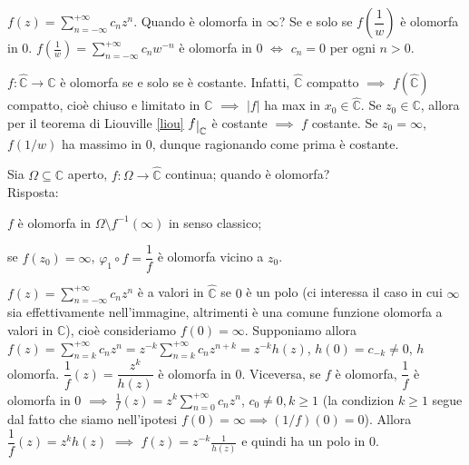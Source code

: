 \begin{ex}
  $\displaystyle f(z)=\sum_{n=-\infty}^{+\infty} c_nz^n$. Quando è olomorfa in $\infty$? Se e solo se $f\left(\dfrac{1}{w}\right)$ è olomorfa in $0$.
  $\displaystyle f\left(\frac{1}{w}\right)=\sum_{n=-\infty}^{+\infty} c_nw^{-n}$ è olomorfa in $0$ $\iff$ $c_n=0$ per ogni $n>0$.
\end{ex}

\begin{oss}
  $f: \hat{\mathbb{C}} \longrightarrow \mathbb{C}$ è olomorfa se e solo se è costante. Infatti, $\hat{\mathbb{C}}$ compatto $\implies$ $f(\hat{\mathbb{C}})$ compatto, cioè chiuso e limitato in $\mathbb{C}$ $\implies$ $|f|$ ha max in $x_0 \in \hat{\mathbb{C}}$.
  Se $z_0 \in \mathbb{C}$, allora per il teorema di Liouville \ref{liou} $f \restrict{\mathbb{C}}$ è costante $\implies$ $f$ costante. Se $z_0=\infty$, $f(1/w)$ ha massimo in $0$, dunque ragionando come prima è costante.
\end{oss}

Sia $\Omega \subseteq \mathbb{C}$ aperto, $f:\Omega \longrightarrow \hat{\mathbb{C}}$ continua; quando è olomorfa? \\
Risposta:
\begin{nlist}
  \item $f$ è olomorfa in $\Omega \setminus f^{-1}(\infty)$ in senso classico;
  \item se $f(z_0)=\infty$, $\varphi_1 \circ f=\dfrac{1}{f}$ è olomorfa vicino a $z_0$.
\end{nlist}

\begin{ex}
  $\displaystyle f(z)=\sum_{n=-\infty}^{+\infty} c_nz^n$ è a valori in $\hat{\mathbb{C}}$ se $0$ è un polo (ci interessa il caso in cui $\infty$ sia effettivamente nell'immagine, altrimenti è una comune funzione olomorfa a valori in $\mathbb{C}$), cioè consideriamo $f(0)=\infty$.
  Supponiamo allora $\displaystyle f(z)=\sum_{n=k}^{+\infty} c_nz^n=z^{-k}\sum_{n=k}^{+\infty} c_nz^{n+k}=z^{-k}h(z)$, $h(0)=c_{-k}\not=0$, $h$ olomorfa. $\dfrac{1}{f}(z)=\dfrac{z^k}{h(z)}$ è olomorfa in $0$.
  Viceversa, se $f$ è olomorfa, $\dfrac{1}{f}$ è olomorfa in $0$ $\implies$ $\displaystyle \frac{1}{f}(z)=z^k\sum_{n=0}^{+\infty}c_nz^n$, $c_0 \not=0, k \ge 1$ (la condizion $k \ge 1$ segue dal fatto che siamo nell'ipotesi $f(0)=\infty \implies (1/f)(0)=0$).
  Allora $\dfrac{1}{f}(z)=z^kh(z)$ $\implies$ $f(z)=z^{-k}\frac{1}{h(z)}$ e quindi ha un polo in $0$.
\end{ex}

